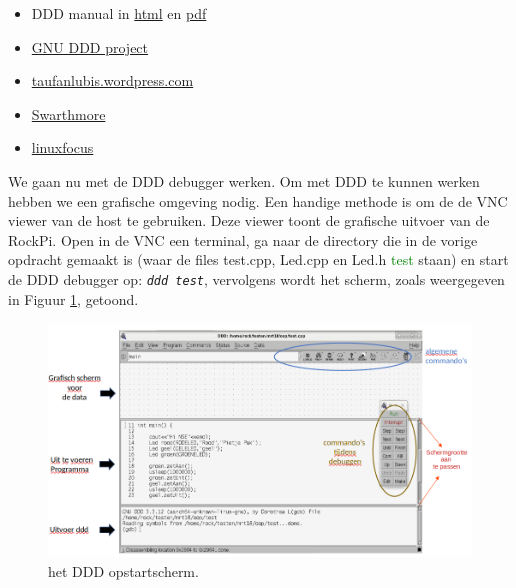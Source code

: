\begin{itemize}
	\item DDD manual in \href{https://www.gnu.org/software/ddd/manual/html_mono/ddd.html}{html} en \href{https://www.gnu.org/software/ddd/manual/pdf/ddd.pdf}{pdf}
	\item \href{https://www.gnu.org/software/ddd/}{GNU DDD project}
	\item \href{href="https://taufanlubis.wordpress.com/2019/02/19/gnu-debugger-front-end-graphical-user-interface-with-ddd}{taufanlubis.wordpress.com}
	\item  \href{https://www.cs.swarthmore.edu/~newhall/unixhelp/howto_gdb.php}{Swarthmore}
	\item  \href{http://www.linuxfocus.org/English/January1998/article20.html}{linuxfocus}
\end{itemize}

We gaan nu met de DDD debugger werken.
Om met DDD te kunnen werken hebben we een grafische omgeving nodig. Een handige methode is om de de VNC viewer van de host te gebruiken. Deze viewer toont de grafische uitvoer van de RockPi. Open in de VNC een terminal, ga naar de directory die in de vorige opdracht gemaakt is (waar de files test.cpp, Led.cpp en Led.h \textcolor{green}{test} staan) en start de DDD debugger op:
\texttt{\textit{ddd test}}, vervolgens wordt het scherm, zoals weergegeven in Figuur \ref{fig:dddscherm1}, getoond.
\begin{figure}[h!]
	\captionsetup{justification=centering}
	\includegraphics[width=0.8 \linewidth]{figuren/ddd_startup_screen}
	\centering
	\caption{het DDD opstartscherm.}
	\label{fig:dddscherm1}
\end{figure}

